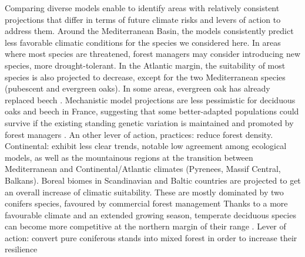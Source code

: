 \documentclass[11pt,letter]{article}
\begin{document}
Comparing diverse models enable to identify areas with relatively consistent projections that differ in terms of future climate risks and levers of action to address them.
Around the Mediterranean Basin, the models consistently predict less favorable climatic conditions for the species we considered here. In areas where most species are threatened, forest managers may consider introducing new species, more drought-tolerant. In the Atlantic margin, the suitability of most species is also projected to decrease, except for the two Mediterranean species (pubescent and evergreen oaks). In some areas, evergreen oak has already replaced beech \citep{Penuelas2003}. Mechanistic model projections are less pessimistic for deciduous oaks and beech in France, suggesting that some better-adapted populations could survive if the existing standing genetic variation is maintained and promoted by forest managers \citep{Brang2014}. An other lever of action, practices: reduce forest density.
Continental: exhibit less clear trends, notable low agreement among ecological models, as well as the mountainous regions at the transition between Mediterranean and Continental/Atlantic climates (Pyrenees, Massif Central, Balkans). 
Boreal biomes in Scandinavian and Baltic countries are projected to get an overall increase of climatic suitability. These are mostly dominated by two conifers species, favoured by commercial forest management
Thanks to a more favourable climate and an extended growing season, temperate deciduous species can become more competitive at the northern margin of their range \citep{Bolte2010}. Lever of action: convert pure coniferous stands into mixed forest in order to increase their resilience \citep{Schauer2023}
\end{document}

